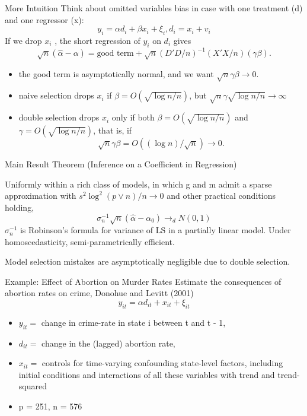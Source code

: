 \documentclass{beamer}
\begin{document}
\begin{frame}{More Intuition}
	\small
	Think about omitted variables bias in case with one treatment (d) and one
regressor (x):
\[ y_i = \alpha d_i + \beta x_i + \xi_i,  d_i = x_i + v_i \]
If we drop $x_i$ , the short regression of $y_i$ on $d_i$ gives
\[ \sqrt{n} (\hat{\alpha} - \alpha) = \text{good term} + \sqrt{n} (D'D/n)^{-1}(X'X/n) (\gamma \beta).\]
\begin{itemize}
\item the good term is asymptotically normal, and we want
$ \sqrt{n} \gamma \beta \rightarrow 0.$
\item naive selection drops $x_i$ if $\beta= O(\sqrt{\log n/n})$, but
$ \sqrt{n} \gamma \sqrt{\log n /n} \rightarrow \infty $
\item double selection drops $x_i$ only if both $\beta= O(\sqrt{\log n/n})$ and $\gamma= O(\sqrt{\log n/n})$, that is, if
\[ \sqrt{n} \gamma \beta = O((\log n)/\sqrt{n}) \rightarrow 0. \]
\end{itemize}
\end{frame}

\begin{frame}{Main Result}
Theorem (Inference on a Coefficient in Regression)

Uniformly within a rich class of models, in which g and m admit a
sparse approximation with $s^2 \log^2(p \vee n)/n \rightarrow 0$ and other practical
conditions holding,
\[ \sigma_n^{-1} \sqrt{n} (\hat{\alpha}-\alpha_0) \rightarrow_d N(0,1) \]
$\sigma_n^{-1}$ is Robinson's formula for variance of LS in a partially linear
model. Under homoscedasticity, semi-parametrically efficient.

Model selection mistakes are asymptotically negligible due to
double selection.
\end{frame}

\begin{frame}{Example: Effect of Abortion on Murder Rates}
Estimate the consequences of abortion rates on crime, Donohue and
Levitt (2001)
\[ y_{it} = \alpha d_{it} + x_{it} + \xi_{it} \]
\begin{itemize}
\item $y_{it} =$ change in crime-rate in state i between t and t - 1,
\item $d_{it} =$ change in the (lagged) abortion rate,
\item $x_{it} =$ controls for time-varying confounding state-level factors,
including initial conditions and interactions of all these variables
with trend and trend-squared
\item p = 251, n = 576
\end{itemize}
\end{frame}
\end{document}
